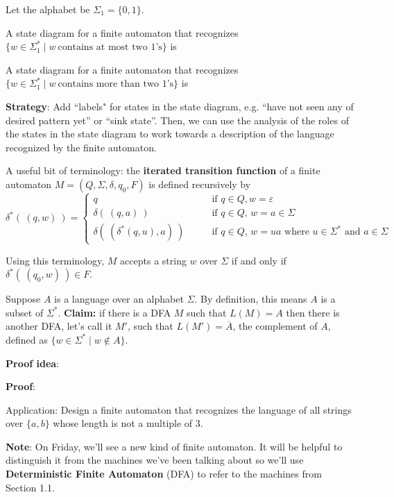 \documentclass[12pt, oneside]{article}
\begin{document}
\newpage
Let the alphabet be $\Sigma_1 = \{0,1\}$.

A state diagram for a finite automaton that recognizes $\{w \in \Sigma_1^* \mid w~\text{contains at most two $1$'s} \}$ is

\vfill

A state diagram for a finite automaton that recognizes $\{w \in \Sigma_1^* \mid w~\text{contains more than two $1$'s} \}$ is

\vfill

\textbf{Strategy}: Add ``labels" for states in the state diagram, e.g. 
``have not seen any of desired pattern yet'' or ``sink state''.
Then, we can use the analysis of the roles of the states in the state diagram to work towards a 
description of the language recognized by the finite automaton. 

\vfill
A useful bit of terminology: the {\bf iterated transition function} of a finite automaton
$M = (Q, \Sigma, \delta, q_0, F)$ is defined recursively by
\[
\delta^* (~(q,w)~) 
=\begin{cases}
q  \qquad &\text{if $q \in Q, w = \varepsilon$} \\
\delta( ~(q,a)~) \qquad &\text{if $q \in Q$, $w = a \in \Sigma$ } \\
\delta(~(\delta^*(q,u), a) ~) \qquad &\text{if $q \in Q$, $w = ua$ where $u \in  \Sigma^*$ and $a \in \Sigma$}
\end{cases}
\]

Using  this terminology, $M$ accepts a string $w$ over $\Sigma$ if and only if $\delta^*( ~(q_0,w)~) \in F$.

\newpage
Suppose $A$ is a language over an alphabet $\Sigma$. By definition, this means $A$ is a subset of $\Sigma^*$.
{\bf Claim:} if there is a DFA $M$ such that $L(M) = A$ then there is another DFA, let's call it $M'$, such that 
$L(M') = \overline{A}$, the complement of $A$, defined as $\{ w \in \Sigma^* \mid w \notin A \}$.

{\bf Proof idea}:


{\bf Proof}: 




\vfill

Application: Design a finite automaton that recognizes the language of all strings over $\{a,b\}$
whose length is not a multiple of $3$.

\vfill

{\bf Note}: On Friday, we'll see a new kind of finite automaton. It will be helpful to distinguish it from the
machines we've been talking about so we'll use {\bf Deterministic Finite Automaton} (DFA) to refer to the machines 
from Section 1.1. \vfill
\end{document}
